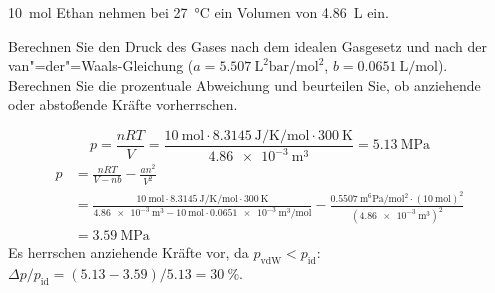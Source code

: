 \documentclass[DIV11]{scrartcl}
\begin{document}
\begin{question}[name=Ideales vs. reales Gas]
\SI{10}{\mole} Ethan nehmen bei \SI{27}{\celsius} ein Volumen von
\SI{4.86}{\liter} ein.
\begin{tasks}
  \task Berechnen Sie den Druck des Gases nach dem idealen Gasgesetz und
  \task nach der van"=der"=Waals-Gleichung ($a =
    \SI{5.507}{\liter\squared\bar\per\mole\squared}$, $b =
    \SI{0.0651}{\liter\per\mole}$).
  \task Berechnen Sie die prozentuale Abweichung und beurteilen Sie, ob
    anziehende oder abstoßende Kräfte vorherrschen.
\end{tasks}
\end{question}
\begin{solution}[name=Ideales vs. reales Gas]
\begin{tasks}
  \task
    \[
      p = \frac{nRT}{V}
        = \frac
            {
              \SI{10}{\mole} \cdot \SI{8.3145}{\joule\per\kelvin\per\mole}
              \cdot \SI{300}{\kelvin}
            }
            {\SI{4.86e-3}{\metre\cubed}}
        = \SI{5.13}{\mega\pascal}
    \]
  \task
    \begin{align*}
      p &= \frac{nRT}{V-nb}-\frac{an^2}{V^2} \\
        &= \frac
             {
               \SI{10}{\mole} \cdot \SI{8.3145}{\joule\per\kelvin\per\mole}
               \cdot \SI{300}{\kelvin}
             }
             {\SI{4.86e-3}{\metre\cubed} -
           \SI{10}{\mole}\cdot\SI{0.0651e-3}{\metre\cubed\per\mole} }
         -
           \frac
             {
               \SI{0.5507}{\metre^6\pascal\per\mole^2} \cdot
               (\SI{10}{\mole})^2
             }
             { (\SI{4.86e-3}{\metre\cubed})^2 } \\
        &= \SI{3.59}{\mega\pascal}
    \end{align*}
  \task Es herrschen anziehende  Kräfte vor, da $p_{\text{vdW}} <
    p_{\text{id}}$: $ \Delta p/p_\text{id} = (5.13 - 3.59)/5.13 =
    \SI{30}{\percent}$.
\end{tasks}
\end{solution}
\end{document}
